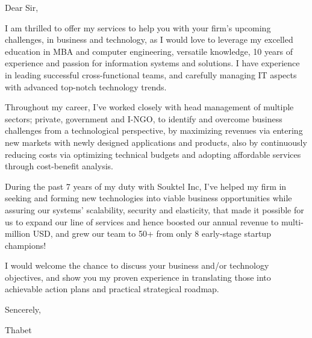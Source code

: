 \vspace{20mm}
\vspace{10mm}


\begin{cvletter}

Dear Sir,

I am thrilled to offer my services to help you with your firm’s upcoming challenges, in business and technology, as I would love to leverage my excelled education in MBA and computer engineering, versatile knowledge, 10 years of experience and passion for information systems and solutions. I have experience in leading successful cross-functional teams, and carefully managing IT aspects with advanced top-notch technology trends.

Throughout my career, I've worked closely with head management of multiple sectors; private, government and I-NGO, to identify and overcome business challenges from a technological perspective, by maximizing revenues via entering new markets with newly designed applications and products, also by continuously reducing costs via optimizing technical budgets and adopting affordable services through cost-benefit analysis.

During the past 7 years of my duty with Souktel Inc, I've helped my firm in seeking and forming new technologies into viable business opportunities while assuring our systems’ scalability, security and elasticity, that made it possible for us to expand our line of services and hence boosted our annual revenue to multi-million USD, and grew our team to 50+ from only 8 early-stage startup champions!

I would welcome the chance to discuss your business and/or technology objectives, and show you my proven experience in translating those into achievable action plans and practical strategical roadmap.

Sencerely,

Thabet
\end{cvletter}

